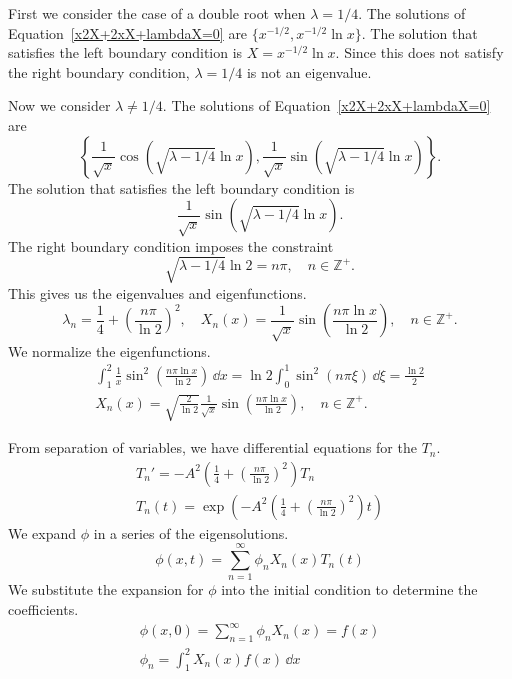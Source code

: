 {\begin{Solution}
  First we consider the case of a double root when $\lambda = 1/4$.
  The solutions of Equation~\ref{x2X+2xX+lambdaX=0} are 
  $\{ x^{-1/2}, x^{-1/2} \ln x \}$.  The solution that satisfies the
  left boundary condition is $X = x^{-1/2} \ln x$.  Since this does not
  satisfy the right boundary condition, $\lambda = 1/4$ is not an
  eigenvalue.

  Now we consider $\lambda \neq 1/4$.  
  The solutions of Equation~\ref{x2X+2xX+lambdaX=0} are 
  \[
  \left\{ 
    \frac{ 1 }{ \sqrt{x} } \cos \left( \sqrt{ \lambda - 1/4 } \ln x \right), 
    \frac{ 1 }{ \sqrt{x} } \sin \left( \sqrt{ \lambda - 1/4 } \ln x \right) 
  \right\}.
  \]
  The solution that satisfies the left boundary condition is
  \[
  \frac{ 1 }{ \sqrt{x} } \sin \left( \sqrt{ \lambda - 1/4 } \ln x \right).
  \]
  The right boundary condition imposes the constraint
  \[
  \sqrt{ \lambda - 1/4 } \ln 2 = n \pi, \quad n \in \mathbb{Z}^+.
  \]
  This gives us the eigenvalues and eigenfunctions.
  \[
  \lambda_n = \frac{1}{4} + \left( \frac{ n \pi }{ \ln 2 } \right)^2,
  \quad
  X_n(x) = \frac{ 1 }{ \sqrt{x} } \sin \left( 
    \frac{ n \pi \ln x }{ \ln 2 } \right),
  \quad n \in \mathbb{Z}^+.
  \]
  We normalize the eigenfunctions.
  \begin{gather*}
    \int_1^2 \frac{1}{x} \sin^2 \left( 
      \frac{ n \pi \ln x }{ \ln 2 } \right) \,\dd x
    = \ln 2 \int_0^1 \sin^2 ( n \pi \xi ) \,\dd \xi
    = \frac{ \ln 2 }{ 2 } 
    \\
    X_n(x) = \sqrt{ \frac{ 2 }{ \ln 2 } }
    \frac{ 1 }{ \sqrt{x} } \sin \left( 
      \frac{ n \pi \ln x }{ \ln 2 } \right),
    \quad n \in \mathbb{Z}^+.
  \end{gather*}

  From separation of variables, we have differential equations for the $T_n$.
  \begin{gather*}
    T_n' = - A^2 \left( \frac{1}{4} + \left( \frac{ n \pi }{ \ln 2 } \right)^2
    \right) T_n
    \\
    T_n(t) = \exp \left( - A^2 \left( \frac{1}{4} 
        + \left( \frac{ n \pi }{ \ln 2 } \right)^2 \right) t \right)
  \end{gather*}
  We expand $\phi$ in a series of the eigensolutions.
  \[
  \phi(x,t) = \sum_{n=1}^\infty \phi_n X_n(x) T_n(t)
  \]
  We substitute the expansion for $\phi$ into the initial condition to
  determine the coefficients.
  \begin{gather*}
    \phi(x,0) = \sum_{n=1}^\infty \phi_n X_n(x) = f(x) 
    \\
    \phi_n = \int_1^2 X_n(x) f(x) \,\dd x
  \end{gather*}
\end{Solution}









}
